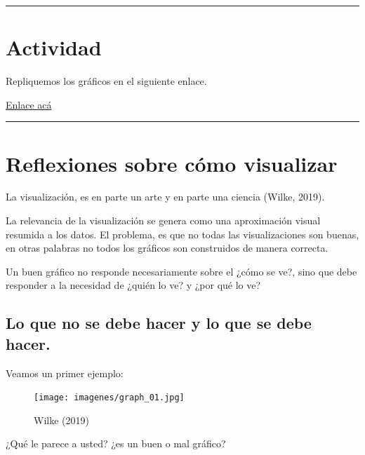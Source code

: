 \documentclass[
  letterpaper,
  DIV=11,
  numbers=noendperiod]{scrartcl}
\begin{document}
\begin{center}\rule{0.5\linewidth}{0.5pt}\end{center}

\hypertarget{actividad}{%
\section{Actividad}\label{actividad}}

Repliquemos los gráficos en el siguiente enlace.

\href{https://ggplot2.tidyverse.org/reference/geom_bar.html}{Enlace acá}

\begin{center}\rule{0.5\linewidth}{0.5pt}\end{center}

\hypertarget{reflexiones-sobre-cuxf3mo-visualizar}{%
\section{Reflexiones sobre cómo
visualizar}\label{reflexiones-sobre-cuxf3mo-visualizar}}

La visualización, es en parte un arte y en parte una ciencia (Wilke,
2019).

La relevancia de la visualización se genera como una aproximación visual
resumida a los datos. El problema, es que no todas las visualizaciones
son buenas, en otras palabras no todos los gráficos son construidos de
manera correcta.

Un buen gráfico no responde necesariamente sobre el ¿cómo se ve?, sino
que debe responder a la necesidad de ¿quién lo ve? y ¿por qué lo ve?

\hypertarget{lo-que-no-se-debe-hacer-y-lo-que-se-debe-hacer.}{%
\subsection{Lo que no se debe hacer y lo que se debe
hacer.}\label{lo-que-no-se-debe-hacer-y-lo-que-se-debe-hacer.}}

Veamos un primer ejemplo:

\begin{figure}[H]

{\centering \texttt{[image: imagenes/graph\_01.jpg]}

}

\caption{Wilke (2019)}

\end{figure}

¿Qué le parece a usted? ¿es un buen o mal gráfico?
\end{document}
